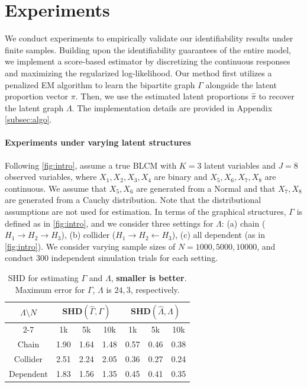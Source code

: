 \documentclass[10pt]{article} %
\def\hat{\widehat}
\begin{document}
%
%
%
%
%
%
%
%







\section{Experiments}\label{sec:sim}
We conduct experiments to empirically validate our identifiability results under finite samples. Building upon the identifiability guarantees of the entire model, we implement a score-based estimator by discretizing the continuous responses and maximizing the regularized log-likelihood. {Our method first utilizes a penalized EM algorithm \citep{ma2023learning} to learn the bipartite graph $\Gamma$ alongside the latent proportion vector $\pi$. Then, we use the estimated latent proportions $\hat{\pi}$ to recover the latent graph $\Lambda$.} The implementation details are provided in Appendix \ref{subsec:algo}.
%
%

\paragraph{Experiments under varying latent structures}
Following \cref{fig:intro}, assume a true BLCM with $K = 3$ latent variables and $J = 8$ observed variables, where $X_1, X_2, X_3, X_4$ are binary and $X_5, X_6, X_7, X_8$ are continuous. We assume that $X_5, X_6$ are generated from a Normal and that $X_7, X_8$ are generated from a Cauchy distribution. Note that the distributional assumptions are not used for estimation. In terms of the graphical structures, $\Gamma$ is defined as in \cref{fig:intro}, and we consider three settings for $\Lambda$: (a) chain ($H_1 \to H_2 \to H_3$), (b) collider ($H_1 \to H_2 \leftarrow H_3$), (c) all dependent (as in \cref{fig:intro}). We consider varying sample sizes of $N = 1000, 5000, 10000$, and conduct 300 independent simulation trials for each setting.

\begin{table}[h!]
    \centering
    \begin{tabular}{ccccccc}
    \toprule
        \multirow{2}{*}{$\Lambda \setminus N$} &
      \multicolumn{3}{c}{SHD$(\hat{\Gamma},\Gamma)$} & \multicolumn{3}{c}{SHD$(\hat{\Lambda},\Lambda)$} \\
      \cmidrule{2-7}
      & 1k & 5k & 10k & 1k & 5k & 10k \\
    \midrule
    Chain & 1.90 & 1.64 & 1.48 & 0.57 & 0.46 & 0.38 \\
    Collider & 2.51 & 2.24 & 2.05 & 0.36 & 0.27 & 0.24 \\
    Dependent & 1.83 & 1.56 & 1.35 & 0.45 & 0.41 & 0.35 \\
    \bottomrule
    \end{tabular}
    \vspace{0.2cm}
    \caption{SHD for estimating $\Gamma$ and $\Lambda$, \textbf{smaller is better}. Maximum error for $\Gamma$, $\Lambda$ is $24, 3$, respectively.}
    \label{tab:shd}
\end{table}
\end{document}
